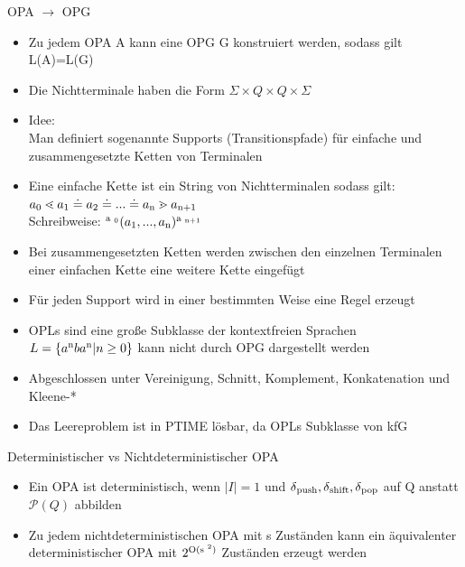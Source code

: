 \documentclass[
10pt,
pantone315, 	%
]{beamer}
\begin{document}
\begin{frame}[t]{OPA $\rightarrow$ OPG}
	\begin{itemize}[<+->]
	\item
	Zu jedem OPA A kann eine OPG G konstruiert werden, sodass gilt L(A)=L(G)
	\item
	Die Nichtterminale haben die Form $\Sigma \times Q \times Q \times \Sigma$
	\item
	Idee: \\
	Man definiert sogenannte Supports (Transitionspfade) für einfache und zusammengesetzte Ketten von Terminalen
	\item
	Eine einfache Kette ist ein String von Nichtterminalen sodass gilt: $a \textsubscript{0} \lessdot a \textsubscript{1} \doteq a \textsubscript{2} \doteq ... \doteq a \textsubscript{n} \gtrdot a \textsubscript{n+1}$ \\
	Schreibweise:  $\textsuperscript{a \textsubscript{0}}( a \textsubscript{1},..., a \textsubscript{n}) \textsuperscript{a \textsubscript{n+1}}$
	\item
	Bei zusammengesetzten Ketten werden zwischen den einzelnen Terminalen einer einfachen Kette eine weitere Kette eingefügt
	\item
	Für jeden Support wird in einer bestimmten Weise eine Regel erzeugt 
	
	\end{itemize}
\end{frame}

\begin{frame}[t]{\secname}
	\begin{itemize}[<+->]
	\item 
	OPLs sind eine große Subklasse der kontextfreien Sprachen\\
	$L=\{ a \textsuperscript{n} b a \textsuperscript{n} | n \geq 0\}$ kann nicht durch OPG dargestellt werden
	\item
	Abgeschlossen unter Vereinigung, Schnitt, Komplement, Konkatenation und Kleene-*
	\item
	Das Leereproblem ist in PTIME lösbar, da OPLs Subklasse von kfG	
	\end{itemize}
\end{frame}


\begin{frame}[t]{Deterministischer vs Nichtdeterministischer OPA}
	\begin{itemize}
	\item
	Ein OPA ist deterministisch, wenn $|I| = 1$ und $\delta \textsubscript{push}, \delta \textsubscript{shift}, \delta \textsubscript{pop}$ auf Q anstatt $\mathcal{P}(Q)$ abbilden
	\item
	Zu jedem nichtdeterministischen OPA mit s Zuständen kann ein äquivalenter deterministischer OPA mit $2 \textsuperscript{O(s \textsuperscript{2})}$ Zuständen erzeugt werden
	\end{itemize}
\end{frame}
\end{document}
